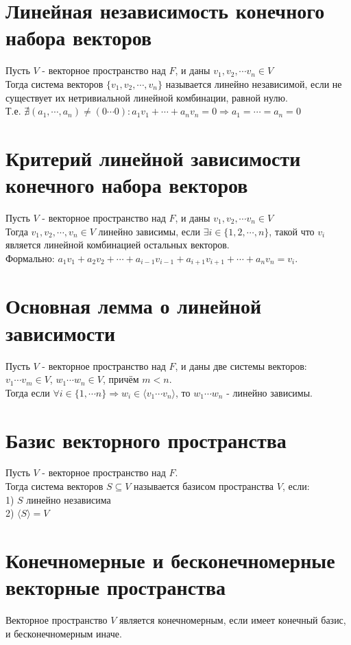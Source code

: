 \documentclass[a4paper,11pt]{report}
\begin{document}
\section{Линейная независимость конечного набора векторов}
Пусть $V$ - векторное пространство над $F$, и даны $v_1, v_2, \cdots v_n \in V$\\
Тогда система векторов $\{ v_1, v_2, \cdots, v_n \}$ называется линейно независимой,
если не существует их нетривиальной линейной комбинации, равной нулю.\\
Т.е. $\nexists (a_1, \cdots, a_n) \neq (0 \cdots 0): a_1v_1 + \cdots + a_nv_n = 0 \Rightarrow a_1 = \cdots = a_n = 0$\\
\section{Критерий линейной зависимости конечного набора векторов}
Пусть $V$ - векторное пространство над $F$, и даны $v_1, v_2, \cdots v_n \in V$\\
Тогда $v_1, v_2, \cdots, v_n \in V$ линейно зависимы, если $\exists i \in \{1, 2, \cdots, n\}$, такой что
$v_i$ является линейной комбинацией остальных векторов.\\
Формально: $a_1v_1 + a_2v_2 + \cdots + a_{i-1}v_{i-1} + a_{i+1}v_{i+1} + \cdots + a_nv_n = v_i$.
\section{Основная лемма о линейной зависимости}
Пусть $V$ - векторное пространство над $F$, и даны две системы векторов:\\
$v_1 \cdots v_m \in V$, $w_1 \cdots w_n \in V$, причём $m < n$.\\
Тогда если $\forall i \in \{1, \cdots n\} \Rightarrow w_i \in \langle v_1 \cdots v_n \rangle$, то $w_1 \cdots w_n$ - линейно зависимы.\\
\section{Базис векторного пространства}
Пусть $V$ - векторное пространство над $F$.\\
Тогда система векторов $S \subseteq V$ называется базисом пространства $V$, если:\\
1) $S$ линейно независима\\
2) $\langle{S}\rangle = V$\\
\section{Конечномерные и бесконечномерные векторные пространства}
Векторное пространство $V$ является конечномерным, если имеет конечный базис, и бесконечномерным иначе.
\end{document}
